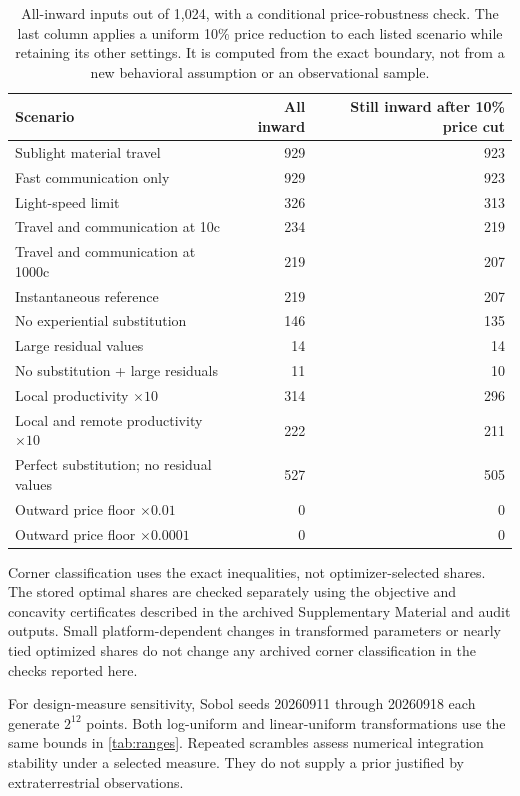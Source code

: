 \documentclass[11pt,a4paper]{article}
\theoremstyle{definition}\newtheorem{definition}{Definition}
\begin{document}
\begin{table}[htbp]
\centering\small
\caption{All-inward inputs out of 1,024, with a conditional price-robustness check. The last column applies a uniform 10\% price reduction to each listed scenario while retaining its other settings. It is computed from the exact boundary, not from a new behavioral assumption or an observational sample.}
\label{tab:scenarios}

\begin{tabularx}{\textwidth}{@{}Xrr@{}}
\toprule
Scenario & All inward & Still inward after 10\% price cut \\
\midrule
Sublight material travel & 929 & 923 \\
Fast communication only & 929 & 923 \\
Light-speed limit & 326 & 313 \\
Travel and communication at 10c & 234 & 219 \\
Travel and communication at 1000c & 219 & 207 \\
Instantaneous reference & 219 & 207 \\
No experiential substitution & 146 & 135 \\
Large residual values & 14 & 14 \\
No substitution + large residuals & 11 & 10 \\
Local productivity $\times10$ & 314 & 296 \\
Local and remote productivity $\times10$ & 222 & 211 \\
Perfect substitution; no residual values & 527 & 505 \\
Outward price floor $\times0.01$ & 0 & 0 \\
Outward price floor $\times0.0001$ & 0 & 0 \\
\bottomrule
\end{tabularx}


\end{table}

Corner classification uses the exact inequalities, not optimizer-selected shares. The stored optimal shares are checked separately using the objective and concavity certificates described in the archived Supplementary Material and audit outputs. Small platform-dependent changes in transformed parameters or nearly tied optimized shares do not change any archived corner classification in the checks reported here.

For design-measure sensitivity, Sobol seeds 20260911 through 20260918 each generate $2^{12}$ points. Both log-uniform and linear-uniform transformations use the same bounds in \cref{tab:ranges}. Repeated scrambles assess numerical integration stability under a selected measure. They do not supply a prior justified by extraterrestrial observations.
\end{document}
